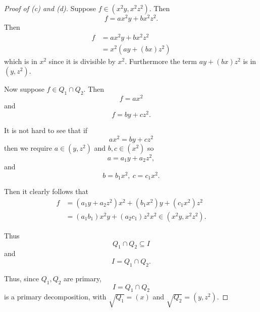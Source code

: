 \documentclass[11pt]{article}
\begin{document}
\begin{proof}[Proof of (c) and (d)]
    Suppose $f \in (x^2y,x^2z^2)$. 
    Then 
    \[
        f = ax^2y + bx^2z^2.
    \]
    Then 
    \begin{align*}
        f &= ax^2y + bx^2z^2 \\ 
        &= x^2(ay+(bx)z^2)
    \end{align*}
    which is in $x^2$ since it is divisible 
    by $x^2$. Furthermore 
    the term $ay + (bx)z^2$ is in 
    $(y,z^2)$. 

    Now suppose $f \in Q_1 \cap Q_2$. 
    Then 
    \[
        f = ax^2 
    \]
    and 
    \[
        f = by + cz^2. 
    \]

    It is not hard to see that if 
    \[
        ax^2 = by+cz^2  
    \]
    then we require $a \in (y,z^2)$ 
    and $b,c \in (x^2)$ so 
    \[
        a = a_1 y + a_2 z^2,   
    \]
    and 
    \[
        b = b_1 x^2, \ c = c_1 x^2. 
    \]

    Then it clearly follows that 
    \begin{align*}
        f &= 
        (a_1y + a_2z^2)x^2 + (b_1x^2)y + (c_1x^2)z^2 \\ 
        &= (a_1b_1)x^2y + (a_2c_1)z^2x^2 \in (x^2y, x^2z^2). 
    \end{align*}

    Thus 
    \[
        Q_1 \cap Q_2 \subseteq I 
    \]
    and 
    \[
        I = Q_1 \cap Q_2. 
    \]

    Thus, since $Q_1,Q_2$ are primary, 
    \[
        I = Q_1 \cap Q_2 
    \]
    is a primary decomposition, 
    with $\sqrt{Q_1} = (x)$ and 
    $\sqrt{Q_2} = (y,z^2)$. 
\end{proof}
\end{document}
